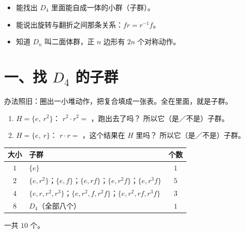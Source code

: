 

\begin{mubiao}
  \begin{itemize}
    \item 能找出 \(D_4\) 里面能自成一体的小群（子群）。
    \item 能说出旋转与翻折之间那条关系：\(fr=r^{-1}f\)。
    \item 知道 \(D_n\) 叫二面体群，正 \(n\) 边形有 \(2n\) 个对称动作。
  \end{itemize}
\end{mubiao}

\section*{一、找 \(D_4\) 的子群}

\noindent 办法照旧：圈出一小堆动作，把复合填成一张表。全在里面，就是子群。

\begin{dongshou}[先检查两个]
  \begin{enumerate}
    \item \(H=\{e,\ r^2\}\)：
      \(r^2\cdot r^2=\) \underline{\hspace{2em}}，跑出去了吗？\underline{\hspace{3em}}
      \quad 所以它\underline{\hspace{2em}}（是／不是）子群。
    \item \(H=\{e,\ r\}\)：
      \(r\cdot r=\) \underline{\hspace{2em}}，这个结果在 \(H\) 里吗？\underline{\hspace{3em}}
      \quad 所以它\underline{\hspace{2em}}（是／不是）子群。
  \end{enumerate}
\end{dongshou}

\begin{example}[\(D_4\) 里全部的子群]
  \begin{center}
  \begin{tabular}{@{}clc@{}}
    \toprule
    大小 & 子群 & 个数 \\
    \midrule
    \(1\) & \(\{e\}\) & \(1\) \\
    \(2\) & \(\{e,r^2\}\)；\(\{e,f\}\)；\(\{e,rf\}\)；\(\{e,r^2f\}\)；\(\{e,r^3f\}\) & \(5\) \\
    \(4\) & \(\{e,r,r^2,r^3\}\)；\(\{e,r^2,f,r^2f\}\)；\(\{e,r^2,rf,r^3f\}\) & \(3\) \\
    \(8\) & \(D_4\)（全部八个） & \(1\) \\
    \bottomrule
  \end{tabular}
  \end{center}
  一共 \(10\) 个。
\end{example}

